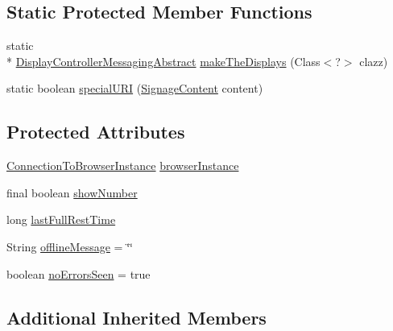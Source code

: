 \subsection*{Static Protected Member Functions}
\begin{DoxyCompactItemize}
\item 
static \\*
\hyperlink{classgov_1_1fnal_1_1ppd_1_1dd_1_1display_1_1client_1_1DisplayControllerMessagingAbstract}{Display\-Controller\-Messaging\-Abstract} \hyperlink{classgov_1_1fnal_1_1ppd_1_1dd_1_1display_1_1client_1_1DisplayControllerMessagingAbstract_ad405437545b641b1c4d00d2267209376}{make\-The\-Displays} (Class$<$?$>$ clazz)
\item 
static boolean \hyperlink{classgov_1_1fnal_1_1ppd_1_1dd_1_1display_1_1client_1_1DisplayControllerMessagingAbstract_a78a7e10e4def66421424bd02c69611ab}{special\-U\-R\-I} (\hyperlink{interfacegov_1_1fnal_1_1ppd_1_1dd_1_1signage_1_1SignageContent}{Signage\-Content} content)
\end{DoxyCompactItemize}
\subsection*{Protected Attributes}
\begin{DoxyCompactItemize}
\item 
\hyperlink{classgov_1_1fnal_1_1ppd_1_1dd_1_1display_1_1client_1_1ConnectionToBrowserInstance}{Connection\-To\-Browser\-Instance} \hyperlink{classgov_1_1fnal_1_1ppd_1_1dd_1_1display_1_1client_1_1DisplayControllerMessagingAbstract_a9aa126a982c0632f38391be7cad4b141}{browser\-Instance}
\item 
final boolean \hyperlink{classgov_1_1fnal_1_1ppd_1_1dd_1_1display_1_1client_1_1DisplayControllerMessagingAbstract_aca138d2835d0f3794bc86261ad550f18}{show\-Number}
\item 
long \hyperlink{classgov_1_1fnal_1_1ppd_1_1dd_1_1display_1_1client_1_1DisplayControllerMessagingAbstract_ad7195dfea86f9821bea794e23a9642ca}{last\-Full\-Rest\-Time}
\item 
String \hyperlink{classgov_1_1fnal_1_1ppd_1_1dd_1_1display_1_1client_1_1DisplayControllerMessagingAbstract_a6c6ececd9f4e0f03ff305dedcc8d81cf}{offline\-Message} = \char`\"{}\char`\"{}
\item 
boolean \hyperlink{classgov_1_1fnal_1_1ppd_1_1dd_1_1display_1_1client_1_1DisplayControllerMessagingAbstract_ad9efc61d6643e94dc2e6d8bc144e43a2}{no\-Errors\-Seen} = true
\end{DoxyCompactItemize}
\subsection*{Additional Inherited Members}


